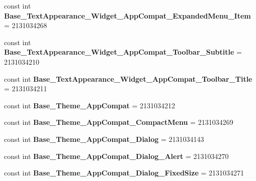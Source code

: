\begin{DoxyCompactItemize}
\item 
\hypertarget{classClient_1_1Droid_1_1Resource_1_1Style_a6e4fa096d728fbedd543690cf23de01f}{}const int {\bfseries Base\+\_\+\+Text\+Appearance\+\_\+\+Widget\+\_\+\+App\+Compat\+\_\+\+Expanded\+Menu\+\_\+\+Item} = 2131034268\label{classClient_1_1Droid_1_1Resource_1_1Style_a6e4fa096d728fbedd543690cf23de01f}

\item 
\hypertarget{classClient_1_1Droid_1_1Resource_1_1Style_a4649d9230987a50c160be18e52a8d1e3}{}const int {\bfseries Base\+\_\+\+Text\+Appearance\+\_\+\+Widget\+\_\+\+App\+Compat\+\_\+\+Toolbar\+\_\+\+Subtitle} = 2131034210\label{classClient_1_1Droid_1_1Resource_1_1Style_a4649d9230987a50c160be18e52a8d1e3}

\item 
\hypertarget{classClient_1_1Droid_1_1Resource_1_1Style_a1ed34383a8b106e1a4b00ec791146bd2}{}const int {\bfseries Base\+\_\+\+Text\+Appearance\+\_\+\+Widget\+\_\+\+App\+Compat\+\_\+\+Toolbar\+\_\+\+Title} = 2131034211\label{classClient_1_1Droid_1_1Resource_1_1Style_a1ed34383a8b106e1a4b00ec791146bd2}

\item 
\hypertarget{classClient_1_1Droid_1_1Resource_1_1Style_a804f0650e806ddf0630359aa2e86c6d3}{}const int {\bfseries Base\+\_\+\+Theme\+\_\+\+App\+Compat} = 2131034212\label{classClient_1_1Droid_1_1Resource_1_1Style_a804f0650e806ddf0630359aa2e86c6d3}

\item 
\hypertarget{classClient_1_1Droid_1_1Resource_1_1Style_af3eebf786dc33b568736e1f6ffa494c3}{}const int {\bfseries Base\+\_\+\+Theme\+\_\+\+App\+Compat\+\_\+\+Compact\+Menu} = 2131034269\label{classClient_1_1Droid_1_1Resource_1_1Style_af3eebf786dc33b568736e1f6ffa494c3}

\item 
\hypertarget{classClient_1_1Droid_1_1Resource_1_1Style_ade49f373a5b0b8b0dbb06e08fd5d0f53}{}const int {\bfseries Base\+\_\+\+Theme\+\_\+\+App\+Compat\+\_\+\+Dialog} = 2131034143\label{classClient_1_1Droid_1_1Resource_1_1Style_ade49f373a5b0b8b0dbb06e08fd5d0f53}

\item 
\hypertarget{classClient_1_1Droid_1_1Resource_1_1Style_a7ed9f0acf347a7fa7e4e65307fa12b3a}{}const int {\bfseries Base\+\_\+\+Theme\+\_\+\+App\+Compat\+\_\+\+Dialog\+\_\+\+Alert} = 2131034270\label{classClient_1_1Droid_1_1Resource_1_1Style_a7ed9f0acf347a7fa7e4e65307fa12b3a}

\item 
\hypertarget{classClient_1_1Droid_1_1Resource_1_1Style_a98a3a2f3816b76b89caf1ce40206e244}{}const int {\bfseries Base\+\_\+\+Theme\+\_\+\+App\+Compat\+\_\+\+Dialog\+\_\+\+Fixed\+Size} = 2131034271\label{classClient_1_1Droid_1_1Resource_1_1Style_a98a3a2f3816b76b89caf1ce40206e244}


\end{DoxyCompactItemize}

